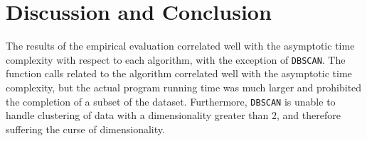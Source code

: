 \documentclass[conference, 10pt]{IEEEtran}
\begin{document}

\section{Discussion and Conclusion}
The results of the empirical evaluation correlated well with the asymptotic time complexity with respect to each algorithm, with the exception of \texttt{DBSCAN}. The function calls related to the algorithm correlated well with the asymptotic time complexity, but the actual program running time was much larger and prohibited the completion of a subset of the dataset. Furthermore, \texttt{DBSCAN} is unable to handle clustering of data with a dimensionality greater than 2, and therefore suffering the curse of dimensionality. \cite{optimal}
\end{document}
